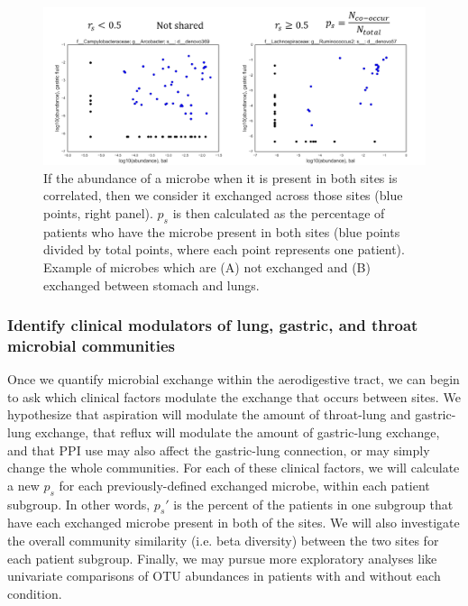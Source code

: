\documentclass[12pt]{article}
\begin{document}
\begin{figure}
\begin{center}
    \includegraphics[scale=0.6]{sharedness_definition}
    \caption{If the abundance of a microbe when it is 
    present in both sites is correlated, then we consider it exchanged 
    across those sites (blue points, right panel). $p_s$ is then calculated as the 
    percentage of patients who have the microbe present in both sites (blue 
    points divided by total points, where each point represents one patient). 
    Example of microbes which are (A) not exchanged and (B) exchanged between stomach and lungs.}\label{fig:sharedness_defn}
\end{center}
\end{figure}

\subsubsection{Identify clinical modulators of lung, gastric, and throat microbial communities}

Once we quantify microbial exchange within the aerodigestive tract, we 
can begin to ask which clinical factors modulate the exchange 
that occurs between sites. We hypothesize that aspiration will modulate the 
amount of throat-lung and gastric-lung exchange, that reflux will modulate 
the amount of gastric-lung exchange, and that PPI use may also affect
the gastric-lung connection, or may simply change the whole communities.
For each of these clinical factors, we will calculate a new $p_s$ for 
each previously-defined exchanged microbe, within each patient subgroup.
In other words, $p_s'$ is the percent of the patients in one subgroup
that have each exchanged microbe present in both of the sites.
We will also investigate the overall community similarity (i.e. beta diversity) 
between the two sites for each patient subgroup. Finally, we may pursue
more exploratory analyses like univariate comparisons of OTU abundances
in patients with and without each condition.
\end{document}
